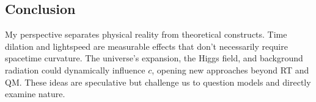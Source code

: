 \documentclass[a4paper,12pt]{article}
\begin{document}
		\subsection{Conclusion}
		My perspective separates physical reality from theoretical constructs. Time dilation and lightspeed are measurable effects that don’t necessarily require spacetime curvature. The universe’s expansion, the Higgs field, and background radiation could dynamically influence \( c \), opening new approaches beyond RT and QM. These ideas are speculative but challenge us to question models and directly examine nature.
		
\end{document}
